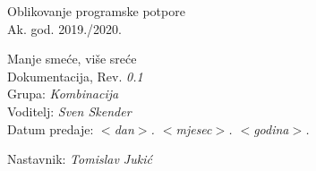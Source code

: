 \documentclass[12pt]{report}
\begin{document}
	

	\begin{titlepage}
		\begin{center}
			\LARGE Oblikovanje programske potpore\\
			\large Ak. god. 2019./2020.\\
			
			
			\huge Manje smeće, više sreće\\
			\Large Dokumentacija, Rev. \textit{0.1}\\
			
			\normalsize
			Grupa: \textit{Kombinacija}\\
			Voditelj: \textit{Sven Skender}\\
			
			
			Datum predaje: \textit{$<$dan$>$. $<$mjesec$>$. $<$godina$>$.}\\
	
			
			Nastavnik: \textit{Tomislav Jukić}\\
		
		\end{center}

	
	\end{titlepage}

	
	\tableofcontents

	
	
	
	
	
	
	
	
	
	\begingroup
	\renewcommand*\listfigurename{Indeks slika i dijagrama}
	\listoffigures
	\endgroup


	
	\eject 
		
	
\end{document}
